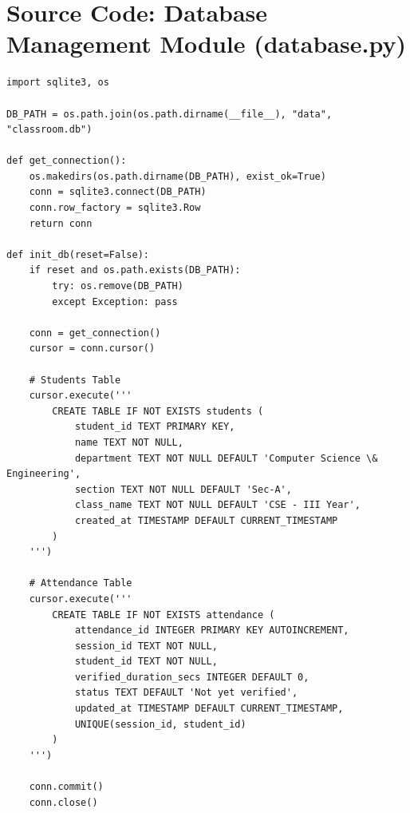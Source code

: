 \documentclass[10pt]{report}
\begin{document}
\section{Source Code: Database Management Module (database.py)}
\begin{lstlisting}[caption={Database Management Module (database.py)}]
import sqlite3, os

DB_PATH = os.path.join(os.path.dirname(__file__), "data", "classroom.db")

def get_connection():
    os.makedirs(os.path.dirname(DB_PATH), exist_ok=True)
    conn = sqlite3.connect(DB_PATH)
    conn.row_factory = sqlite3.Row
    return conn

def init_db(reset=False):
    if reset and os.path.exists(DB_PATH):
        try: os.remove(DB_PATH)
        except Exception: pass

    conn = get_connection()
    cursor = conn.cursor()

    # Students Table
    cursor.execute('''
        CREATE TABLE IF NOT EXISTS students (
            student_id TEXT PRIMARY KEY,
            name TEXT NOT NULL,
            department TEXT NOT NULL DEFAULT 'Computer Science \& Engineering',
            section TEXT NOT NULL DEFAULT 'Sec-A',
            class_name TEXT NOT NULL DEFAULT 'CSE - III Year',
            created_at TIMESTAMP DEFAULT CURRENT_TIMESTAMP
        )
    ''')

    # Attendance Table
    cursor.execute('''
        CREATE TABLE IF NOT EXISTS attendance (
            attendance_id INTEGER PRIMARY KEY AUTOINCREMENT,
            session_id TEXT NOT NULL,
            student_id TEXT NOT NULL,
            verified_duration_secs INTEGER DEFAULT 0,
            status TEXT DEFAULT 'Not yet verified',
            updated_at TIMESTAMP DEFAULT CURRENT_TIMESTAMP,
            UNIQUE(session_id, student_id)
        )
    ''')

    conn.commit()
    conn.close()
\end{lstlisting}

\renewcommand\bibname{References}
\end{document}

